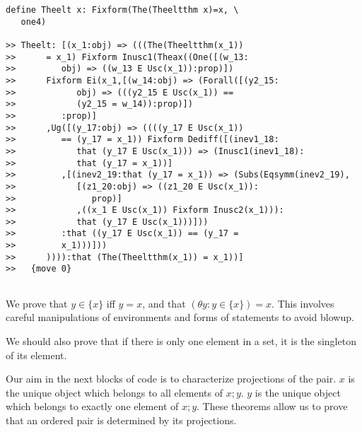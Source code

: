\documentclass[12pt]{article}
\begin{document}
\begin{verbatim}
define Theelt x: Fixform(The(Theeltthm x)=x, \
   one4)

>> Theelt: [(x_1:obj) => (((The(Theeltthm(x_1))
>>      = x_1) Fixform Inusc1(Theax((One([(w_13:
>>         obj) => ((w_13 E Usc(x_1)):prop)])
>>      Fixform Ei(x_1,[(w_14:obj) => (Forall([(y2_15:
>>            obj) => (((y2_15 E Usc(x_1)) ==
>>            (y2_15 = w_14)):prop)])
>>         :prop)]
>>      ,Ug([(y_17:obj) => ((((y_17 E Usc(x_1))
>>         == (y_17 = x_1)) Fixform Dediff([(inev1_18:
>>            that (y_17 E Usc(x_1))) => (Inusc1(inev1_18):
>>            that (y_17 = x_1))]
>>         ,[(inev2_19:that (y_17 = x_1)) => (Subs(Eqsymm(inev2_19),
>>            [(z1_20:obj) => ((z1_20 E Usc(x_1)):
>>               prop)]
>>            ,((x_1 E Usc(x_1)) Fixform Inusc2(x_1))):
>>            that (y_17 E Usc(x_1)))]))
>>         :that ((y_17 E Usc(x_1)) == (y_17 =
>>         x_1)))]))
>>      )))):that (The(Theeltthm(x_1)) = x_1))]
>>   {move 0}


\end{verbatim}

We prove that $y \in \{x\}$ iff $y=x$, and that $(\theta y: y \in \{x\})=x$.  This involves careful manipulations of environments and forms of statements to avoid blowup.

We should also prove that if there is only one element in a set, it is the singleton of its element.

Our aim in the next blocks of code is to characterize projections of the pair.  $x$ is the unique object which belongs to all elements of $x;y$.  $y$ is the unique object which belongs to exactly one element of $x;y$.  These theorems allow us to prove that an ordered pair is determined by its projections.
\end{document}

